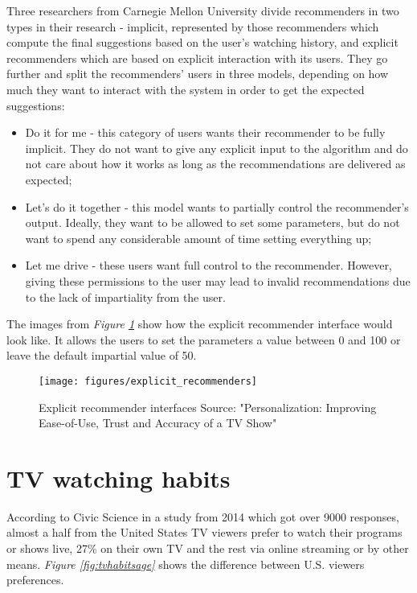 Three researchers from Carnegie Mellon University divide recommenders in two types in their research \cite{8} - implicit, represented by those recommenders which compute the final suggestions based on the user's watching history, and explicit recommenders which are based on explicit interaction with its users. They go further and split the recommenders' users in three models, depending on how much they want to interact with the system in order to get the expected suggestions:

\begin{itemize}
  \item Do it for me - this category of users wants their recommender to be fully implicit. They do not want to give any explicit input to the algorithm and do not care about how it works as long as the recommendations are delivered as expected;
  \item Let's do it together - this model wants to partially control the recommender's output. Ideally, they want to be allowed to set some parameters, but do not want to spend any considerable amount of time setting everything up;
  \item Let me drive - these users want full control to the recommender. However, giving these permissions to the user may lead to invalid recommendations due to the lack of impartiality from the user.
\end{itemize}

The images from \textit{Figure \ref{fig:explicitrecommenders}} show how the explicit recommender interface would look like. It allows the users to set the parameters a value between 0 and 100 or leave the default impartial value of 50.

\begin{figure}[h]
\centering
\texttt{[image: figures/explicit\_recommenders]}
\caption{Explicit recommender interfaces \newline
Source: "Personalization: Improving Ease-of-Use, Trust and Accuracy of a TV Show"}
\label{fig:explicitrecommenders}
\end{figure}

\section{TV watching habits}

According to Civic Science in a study from 2014 \cite{9} which got over 9000 responses, almost a half from the United States TV viewers prefer to watch their programs or shows live, 27\% on their own TV and the rest via online streaming or by other means. \textit{Figure \ref{fig:tvhabitsage}} shows the difference between U.S. viewers preferences.

